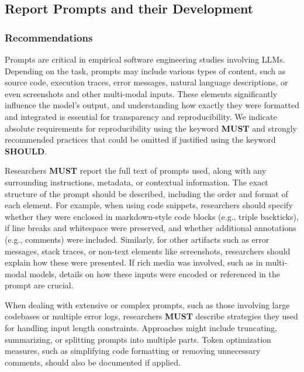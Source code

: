 



\subsection{Report Prompts and their Development}



\subsubsection{Recommendations}
Prompts are critical in empirical software engineering studies involving LLMs. Depending on the task, prompts may include various types of content, such as source code, execution traces, error messages, natural language descriptions, or even screenshots and other multi-modal inputs. These elements significantly influence the model’s output, and understanding how exactly they were formatted and integrated is essential for transparency and reproducibility. We indicate absolute requirements for reproducibility using the keyword \textbf{MUST} and strongly recommended practices that could be omitted if justified using the keyword \textbf{SHOULD}.

Researchers \textbf{MUST} report the full text of prompts used, along with any surrounding instructions, metadata, or contextual information. The exact structure of the prompt should be described, including the order and format of each element. For example, when using code snippets, researchers should specify whether they were enclosed in markdown-style code blocks (e.g., triple backticks), if line breaks and whitespace were preserved, and whether additional annotations (e.g., comments) were included. Similarly, for other artifacts such as error messages, stack traces, or non-text elements like screenshots, researchers should explain how these were presented. If rich media was involved, such as in multi-modal models, details on how these inputs were encoded or referenced in the prompt are crucial.

When dealing with extensive or complex prompts, such as those involving large codebases or multiple error logs, researchers \textbf{MUST} describe strategies they used for handling input length constraints. Approaches might include truncating, summarizing, or splitting prompts into multiple parts. Token optimization measures, such as simplifying code formatting or removing unnecessary comments, should also be documented if applied.

